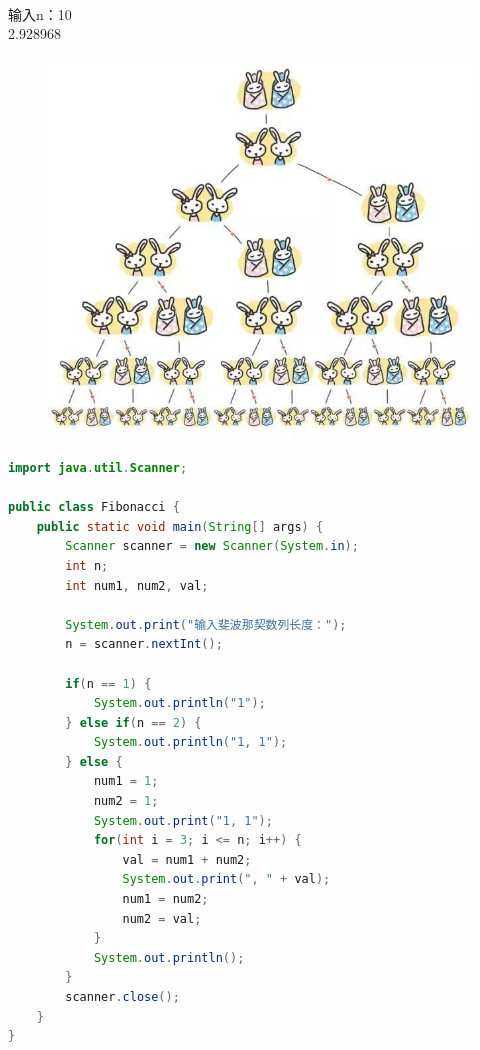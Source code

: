 \begin{tcolorbox}
	 \\
	输入n：10 \\
	2.928968
\end{tcolorbox}

\vspace{0.5cm}


\begin{figure}[H]
	\centering
	\includegraphics[scale=0.5]{img/C4/4-4/1.png}
\end{figure}

\begin{lstlisting}[language=Java]
import java.util.Scanner;

public class Fibonacci {
    public static void main(String[] args) {
        Scanner scanner = new Scanner(System.in);
        int n;
        int num1, num2, val;
        
        System.out.print("输入斐波那契数列长度：");
        n = scanner.nextInt();
        
        if(n == 1) {
            System.out.println("1");
        } else if(n == 2) {
            System.out.println("1, 1");
        } else {
            num1 = 1;
            num2 = 1;
            System.out.print("1, 1");
            for(int i = 3; i <= n; i++) {
                val = num1 + num2;
                System.out.print(", " + val);
                num1 = num2;
                num2 = val;
            }
            System.out.println();
        }
        scanner.close();
    }
}
\end{lstlisting}

